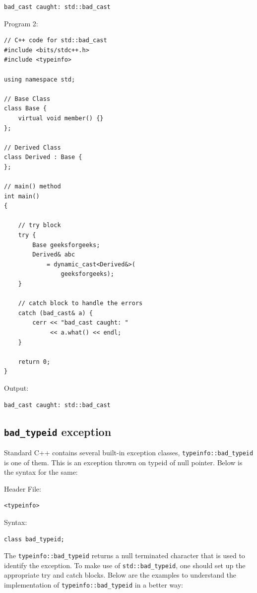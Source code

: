 \documentclass{book}
\begin{document}
\begin{verbatim}
bad_cast caught: std::bad_cast
\end{verbatim}

Program 2:

\begin{lstlisting}
// C++ code for std::bad_cast
#include <bits/stdc++.h>
#include <typeinfo>
  
using namespace std;
  
// Base Class
class Base {
    virtual void member() {}
};
  
// Derived Class
class Derived : Base {
};
  
// main() method
int main()
{
  
    // try block
    try {
        Base geeksforgeeks;
        Derived& abc
            = dynamic_cast<Derived&>(
                geeksforgeeks);
    }
  
    // catch block to handle the errors
    catch (bad_cast& a) {
        cerr << "bad_cast caught: "
             << a.what() << endl;
    }
  
    return 0;
}
\end{lstlisting}
Output:

\begin{verbatim}
bad_cast caught: std::bad_cast
\end{verbatim}

\subsection{\texttt{bad\_typeid} exception}

Standard C++ contains several built-in exception classes, \texttt{typeinfo::bad\_typeid} is one of them. This is an exception thrown on typeid of null pointer. Below is the syntax for the same:

Header File:

\begin{verbatim}
<typeinfo>
\end{verbatim}

Syntax:

\begin{verbatim}
class bad_typeid;
\end{verbatim}

The \texttt{typeinfo::bad\_typeid} returns a null terminated character that is used to identify the exception. To make use of \texttt{std::bad\_typeid}, one should set up the appropriate try and catch blocks. Below are the examples to understand the implementation of \texttt{typeinfo::bad\_typeid} in a better way:
\end{document}
